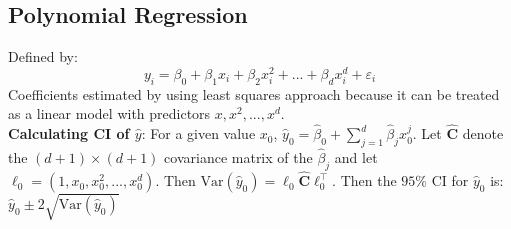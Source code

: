 \documentclass[11pt]{article}
\begin{document}
\subsection{Polynomial Regression}
\noindent Defined by:
$$y_i = \beta_0 + \beta_1x_i + \beta_2x_i^2 + ... + \beta_dx_i^d + \varepsilon_i$$
\noindent Coefficients estimated by using least squares approach because it can be treated as a linear model with predictors $x, x^2,...,x^d$. \\

\noindent \textbf{Calculating CI of $\hat y$}: For a given value $x_0$, $\hat{y}_0 = \hat{\beta}_0 + \sum_{j=1}^{d}{\hat{\beta}_j x_0^j}$. Let $\hat{\boldsymbol{C}}$ denote the $(d+1) \times (d+1)$ covariance matrix of the $\hat\beta_j$ and let $\ell_0 = (1,x_0,x_0^2,...,x_0^d)$. Then $\text{Var}(\hat{y}_0) = \ell_0\hat{\boldsymbol{C}}\ell_0^\top$. Then the $95\%$ CI for $\hat y_0$ is: $\hat{y}_0 \pm 2\sqrt{\text{Var}(\hat y _0)}$
\end{document}
